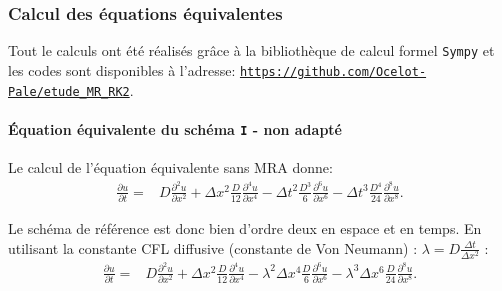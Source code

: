 \subsubsection{Calcul des équations équivalentes}
Tout le calculs ont été réalisés grâce à la bibliothèque de calcul formel \texttt{Sympy} et les codes 
sont disponibles à l'adresse: \href{https://github.com/Ocelot-Pale/etude_MR_RK2}{\nolinkurl{https://github.com/Ocelot-Pale/etude_MR_RK2}}.
\paragraph{Équation équivalente du schéma \texttt{I} - non adapté}
    Le calcul de l'équation équivalente sans MRA donne:
    \begin{align}
        \frac{\partial u}{\partial t}  =&D \frac{\partial^{2}u}{\partial x^{2}}
        + \Delta x^{2} \frac{D}{12}             \frac{\partial^{4}u}{\partial x^{4}} 
        -  \Delta t^{2} \frac{D^{3}}{6}          \frac{\partial^{6}u}{\partial x^{6}} 
        -  \Delta t^{3} \frac{D^{4}}{24}        \frac{\partial^{8}u}{\partial x^{8}}.
    \end{align}
    
    Le schéma de référence est donc bien d'ordre deux en espace et en temps.
    En utilisant la constante CFL diffusive (constante de Von Neumann) : $\lambda = D \frac{\Delta t}{\Delta x^2}$ : 
    \begin{align}\label{eq:ref:cfl}
        \frac{\partial u}{\partial t}  =&D \frac{\partial^{2}u}{\partial x^{2}}
        + \Delta x^{2} \frac{D}{12}             \frac{\partial^{4}u}{\partial x^{4}} 
        - \lambda^2 \Delta  x^{4} \frac{D}{6}          \frac{\partial^{6}u}{\partial x^{6}} 
        - \lambda^3 \Delta x^{6} \frac{D}{24}        \frac{\partial^{8}u}{\partial x^{8}}.
    \end{align}
